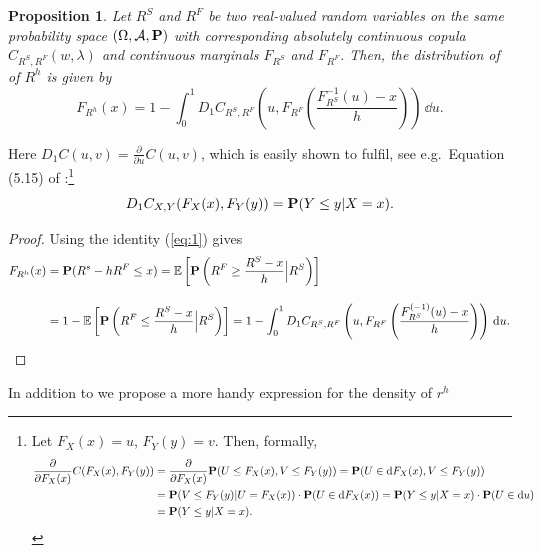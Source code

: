 \documentclass[square]{article} %
\theoremstyle{plain}
\newtheorem{proposition}[theorem]{Proposition}
\theoremstyle{definition} %
\begin{document}
\begin{proposition}
  \label{prop:dfrh}
  Let $R^S$ and $R^F$ be two real-valued random variables on the same
  probability space $(\Omega, \mathcal A, {\bf P})$ with corresponding
  absolutely continuous copula $C_{R^S, R^F}(w,\lambda)$ and
  continuous marginals $F_{R^S}$ and $F_{R^F}$. Then, the distribution
  of of $R^h$ is given by
  \begin{equation}
    \label{eq:3}
    F_{R^h}(x) = 1- \int^1_0 D_1 C_{R^S, R^F}
    \left( u, F_{R^F} \left( \frac{F^{-1}_{R^S}(u)-x}{h} \right)
    \right)\, \dd u.
  \end{equation}
\end{proposition}\medskip
Here $D_1 C(u,v)=\displaystyle \frac{\partial}{\partial u} C(u,v)$,
which is easily shown to fulfil, see e.g.\ Equation (5.15) of
\citep{McNeil2005}:\footnote{%
  Let $F_X(x)=u$, $F_Y(y)=v$. Then, formally,
  \begin{align*}
    \frac{\partial}{\partial F_X(x)} C(F_X(x), F_Y(y)) %
    &= \frac{\partial}{\partial F_X(x)} \p(U\leq F_X(x),
      V\leq F_Y(y)) %
      = \p(U\in \dd F_X(x), V\leq F_Y(y))\\ %
    &= \p(V\leq F_Y(y)| U = F_X(x))\cdot \p(U \in \dd
      F_X(x)) %
      = \p(Y\leq y|X=x)\cdot \p(U\in \dd u)\\ %
    &= \p(Y\leq y|X=x).
  \end{align*}}
\begin{equation}
  \label{eq:1}
  D_1 C_{X,Y}(F_X(x), F_Y(y)) = {\bf P}(Y\leq y|X=x).
\end{equation}
\begin{proof}
  Using the identity (\ref{eq:1}) gives
  \begin{align*}
    F_{R^h}(x) &= \p(R^s - h R^F\leq x) %
                 = \E\left[\p\left(R^F\geq \frac{R^S-x}{h}\Big|
                 R^S\right)\right]\\[10pt]
               &= 1-\E\left[\p\left(R^F\leq \frac{R^S-x}{h}\Big|
                 R^S\right)\right]%
               = 1- \int_0^1 D_1 C_{R^S, R^F}\left(u,
                 F_{R^F}\left(\frac{F^{(-1)}_{R^S}(u) -
                 x}{h}\right)\right)\, \dd u.
  \end{align*}
\end{proof}\medskip

In addition to \cite{Barbi2014} we propose a more handy expression for the density of $r^h$
\end{document}
